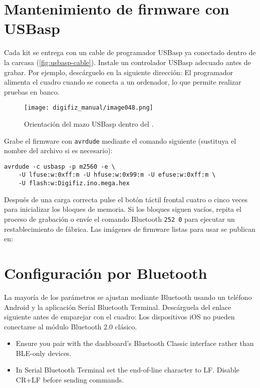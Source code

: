 \section{Mantenimiento de firmware con USBasp}
Cada kit se entrega con un cable de programador USBasp ya conectado dentro de la carcasa (\autoref{fig:usbasp-cable}). Instale un controlador USBasp adecuado antes de grabar. Por ejemplo, descárguelo en la siguiente dirección:
El programador alimenta el cuadro cuando se conecta a un ordenador, lo que permite realizar pruebas en banco.

\begin{figure}[htbp]
    \centering
    \texttt{[image: digifiz\_manual/image048.png]}
    \caption{Orientación del mazo USBasp dentro del \ReplicaGenOne{}.}
    \label{fig:usbasp-cable}
\end{figure}

Grabe el firmware con \texttt{avrdude} mediante el comando siguiente (sustituya el nombre del archivo si es necesario):

\begin{verbatim}
avrdude -c usbasp -p m2560 -e \
    -U lfuse:w:0xff:m -U hfuse:w:0x99:m -U efuse:w:0xff:m \
    -U flash:w:Digifiz.ino.mega.hex
\end{verbatim}

Después de una carga correcta pulse el botón táctil frontal cuatro o cinco veces para inicializar los bloques de memoria. Si los bloques siguen vacíos, repita el proceso de grabación o envíe el comando Bluetooth \verb|252 0| para ejecutar un restablecimiento de fábrica. Las imágenes de firmware listas para usar se publican en:

\section{Configuración por Bluetooth}
La mayoría de los parámetros se ajustan mediante Bluetooth usando un teléfono Android y la aplicación Serial Bluetooth Terminal. Descárguela del enlace siguiente antes de emparejar con el cuadro:
Los dispositivos iOS no pueden conectarse al módulo Bluetooth 2.0 clásico.

\begin{itemize}
    \item Ensure you pair with the dashboard's Bluetooth Classic interface rather than BLE-only devices.
    \item In Serial Bluetooth Terminal set the end-of-line character to LF. Disable CR+LF before sending commands.
\end{itemize}


